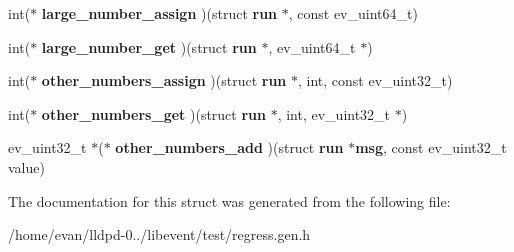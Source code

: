 \begin{DoxyCompactItemize}
\item 
int($\ast$ {\bfseries large\-\_\-number\-\_\-assign} )(struct {\bf run} $\ast$, const ev\-\_\-uint64\-\_\-t)\label{structrun__access___ac7d012a462727e8a96a4486b3b9bfa27}

\item 
int($\ast$ {\bfseries large\-\_\-number\-\_\-get} )(struct {\bf run} $\ast$, ev\-\_\-uint64\-\_\-t $\ast$)\label{structrun__access___ab2444f288e39cf90e969926c8e040a14}

\item 
int($\ast$ {\bfseries other\-\_\-numbers\-\_\-assign} )(struct {\bf run} $\ast$, int, const ev\-\_\-uint32\-\_\-t)\label{structrun__access___ae5485786bebb548f2290a85f209e606a}

\item 
int($\ast$ {\bfseries other\-\_\-numbers\-\_\-get} )(struct {\bf run} $\ast$, int, ev\-\_\-uint32\-\_\-t $\ast$)\label{structrun__access___aae9aae793ef841332036ffb81b955b6d}

\item 
ev\-\_\-uint32\-\_\-t $\ast$($\ast$ {\bfseries other\-\_\-numbers\-\_\-add} )(struct {\bf run} $\ast${\bf msg}, const ev\-\_\-uint32\-\_\-t value)\label{structrun__access___a288963c53a5b30a75ba71c7d235ed879}

\end{DoxyCompactItemize}


\-The documentation for this struct was generated from the following file\-:\begin{DoxyCompactItemize}
\item 
/home/evan/lldpd-\/0../libevent/test/regress.\-gen.\-h\end{DoxyCompactItemize}
